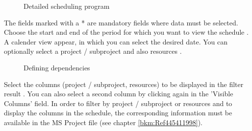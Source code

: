\begin{figure}[H]
\caption{Detailed scheduling program}
\end{figure}

The fields marked with a * are mandatory fields where data must be selected. Choose the start and end of the period for which you want to view the schedule . A calender view appear, in which you can select the desired date. You can optionally select a project / subproject  and also resources .

\begin{figure}[H]
\caption{Defining dependencies}
\end{figure}


Select the columns (project / subproject, resources) to be displayed in the filter result . You can also select a second column by clicking again in the 'Visible Columns' field. In order to filter by project / subproject or resources and to display the columns in the schedule, the corresponding information must be available in the MS Project file (see chapter \ref{bkm:Ref445411998}).

